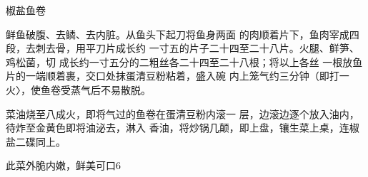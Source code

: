 \begin{recipe}{椒盐鱼卷}

\ingredients


\cooking

\step 鲜鱼破腹、去鳞、去内脏。从鱼头下起刀将鱼身两面 的肉顺着片下，鱼肉宰成四段，去刺去骨，用平刀片成长约 一寸五的片子二十四至二十八片。火腿、鲜笋、鸡松菌，切 成长约一寸五分的二粗丝各二十四至二十八根；将以上各丝 一根放鱼片的一端顺着裹，交口处抹蛋清豆粉粘着，盛入碗 内上笼气约三分钟（即打一火〉，使鱼卷受蒸气后不易散脱。

\step 菜油烧至八成火，即将气过的鱼卷在蛋清豆粉内滚一 层，边滚边逐个放入油内，待炸至金黄色即将油泌去，淋入 香油，将炒锅几颠，即上盘，镶生菜上桌，连椒盐二碟同上。

\notes

此菜外脆内嫩，鲜美可口6

\end{recipe}


